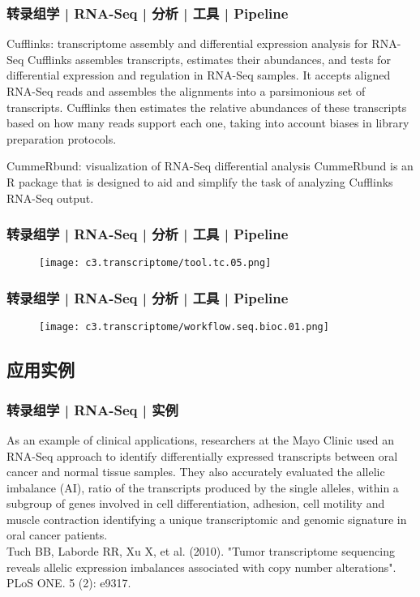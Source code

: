 \begin{frame}
  \frametitle{转录组学 | RNA-Seq | 分析 | 工具 | Pipeline}
  \begin{block}{Cufflinks: transcriptome assembly and differential expression analysis for RNA-Seq}
    Cufflinks assembles transcripts, estimates their abundances, and tests for differential expression and regulation in RNA-Seq samples. It accepts aligned RNA-Seq reads and assembles the alignments into a parsimonious set of transcripts. Cufflinks then estimates the relative abundances of these transcripts based on how many reads support each one, taking into account biases in library preparation protocols.
  \end{block}
  \pause
  \begin{block}{CummeRbund: visualization of RNA-Seq differential analysis}
    CummeRbund is an R package that is designed to aid and simplify the task of analyzing Cufflinks RNA-Seq output.
  \end{block}
\end{frame}

\begin{frame}
  \frametitle{转录组学 | RNA-Seq | 分析 | 工具 | Pipeline}
  \begin{figure}
    \centering
    \texttt{[image: c3.transcriptome/tool.tc.05.png]}
  \end{figure}
\end{frame}

\begin{frame}
  \frametitle{转录组学 | RNA-Seq | 分析 | 工具 | Pipeline}
  \begin{figure}
    \centering
    \texttt{[image: c3.transcriptome/workflow.seq.bioc.01.png]}
  \end{figure}
\end{frame}

\subsection{应用实例}
\begin{frame}
  \frametitle{转录组学 | RNA-Seq | 实例}
  As an example of clinical applications, researchers at the Mayo Clinic used an RNA-Seq approach to identify differentially expressed transcripts between oral cancer and normal tissue samples. They also accurately evaluated the allelic imbalance (AI), ratio of the transcripts produced by the single alleles, within a subgroup of genes involved in cell differentiation, adhesion, cell motility and muscle contraction identifying a unique transcriptomic and genomic signature in oral cancer patients.\\
 Tuch BB, Laborde RR, Xu X, et al. (2010). "Tumor transcriptome sequencing reveals allelic expression imbalances associated with copy number alterations". PLoS ONE. 5 (2): e9317. 
\end{frame}

